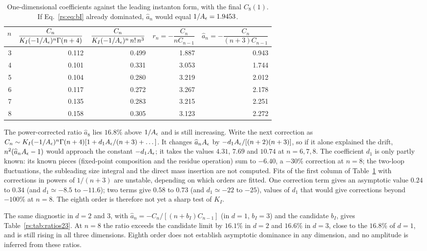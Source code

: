 \begin{table}[htbp]\centering\small
\begin{tabular}{@{}r r r r r@{}}
\toprule
$n$ & $\dfrac{C_n}{K_I(-1/A_\epsilon)^n\Gamma(n+4)}$ & $\dfrac{C_n}{K_I(-1/A_\epsilon)^n\,n!\,n^3}$ &
$r_n=-\dfrac{C_n}{nC_{n-1}}$ & $\widehat a_n=-\dfrac{C_n}{(n+3)C_{n-1}}$\\ \midrule
3 & 0.112 & 0.499 & 1.887 & 0.943\\
4 & 0.101 & 0.331 & 3.053 & 1.744\\
5 & 0.104 & 0.280 & 3.219 & 2.012\\
6 & 0.117 & 0.272 & 3.267 & 2.178\\
7 & 0.135 & 0.283 & 3.215 & 2.251\\
8 & 0.158 & 0.305 & 3.123 & 2.272\\
\bottomrule
\end{tabular}
\caption{One-dimensional coefficients against the leading instanton form, with the
final $C_8(1)$. If Eq.~\eqref{rs:eq:bI} already dominated, $\widehat a_n$ would equal
$1/A_\epsilon=1.9453$.}
\label{rs:tab:mismatch}
\end{table}

The power-corrected ratio $\widehat a_8$ lies $16.8\%$ above $1/A_\epsilon$ and is still
increasing. Write the next correction as
$C_n\sim K_I(-1/A_\epsilon)^n\Gamma(n+4)[1+d_1A_\epsilon/(n+3)+\dots]$. It changes $\widehat a_nA_\epsilon$ by
$-d_1A_\epsilon/[(n+2)(n+3)]$, so if it alone explained the drift, $n^2(\widehat a_nA_\epsilon-1)$ would
approach the constant $-d_1A_\epsilon$; it takes the values $4.31$, $7.69$ and $10.74$ at $n=6,7,8$.
The coefficient $d_1$ is only partly known: its known pieces (fixed-point composition and
the residue operation) sum to $-6.40$, a $-30\%$ correction at $n=8$; the two-loop
fluctuations, the subleading size integral and the direct mass insertion are not computed.
Fits of the first column of Table~\ref{rs:tab:mismatch} with corrections in powers of $1/(n+3)$
are unstable, depending on which orders are fitted. One correction term gives an asymptotic
value $0.24$ to $0.34$ (and $d_1\simeq-8.5$ to $-11.6$); two terms give $0.58$ to $0.73$ (and
$d_1\simeq-22$ to $-25$), values of $d_1$ that would give corrections beyond $-100\%$ at
$n=8$. The eighth order is therefore not yet a sharp test of $K_I$.

The same diagnostic in $d=2$ and $3$, with $\widehat a_n=-C_n/[(n+b_I)C_{n-1}]$ (in $d=1$,
$b_I=3$) and the candidate $b_I$, gives Table~\ref{rs:tab:ratios23}. At $n=8$ the ratio exceeds the candidate limit by
$16.1\%$ in $d=2$ and $16.6\%$ in $d=3$, close to the $16.8\%$ of $d=1$, and is still
rising in all three dimensions. Eighth order does not establish asymptotic dominance in
any dimension, and no amplitude is inferred from these ratios.

